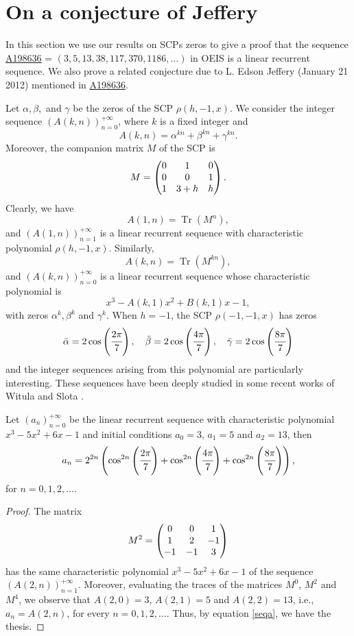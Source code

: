 \documentclass[12pt,reqno]{article}
\newcommand{\seqnum}[1]{\href{http://oeis.org/#1}{\underline{#1}}}
\DeclareMathOperator{\Tr}{Tr}
\begin{document}
\section{On a conjecture of Jeffery}
In this section we use our results on SCPs zeros to give a proof that
the sequence \seqnum{A198636} = $(3, 5, 13, 38, 117, 370, 1186,\ldots)$
in OEIS \cite{oeis} is a linear recurrent sequence. We also prove a
related conjecture due to L. Edson Jeffery (January 21 2012) 
mentioned in \seqnum{A198636}.

Let $\alpha, \beta,$ and $\gamma$ be the zeros of the SCP $\rho(h,-1,x)$. We consider the integer sequence $(A(k,n))_{n=0}^{+\infty}$, where $k$ is a fixed integer and
\begin{equation} \label{seqa}  A(k,n)=\alpha^{kn}+\beta^{kn}+\gamma^{kn}.\end{equation}
Moreover, the companion matrix $M$ of the SCP is
$$M=\begin{pmatrix} 0 & 1 & 0 \cr 0 & 0 & 1 \cr 1 & 3+h & h  \end{pmatrix}.$$ Clearly, we have
$$A(1,n)=\Tr(M^n),$$
and $(A(1,n))_{n=1}^{+\infty}$ is a linear recurrent sequence with characteristic polynomial $\rho(h,-1,x)$. Similarly, 
$$A(k,n)=\Tr(M^{kn}),$$
and $(A(k,n))_{n=0}^{+\infty}$ is a linear recurrent sequence whose characteristic polynomial is $$x^3-A(k,1)x^2+B(k,1)x-1,$$ with zeros $\alpha^k, \beta^k$ and $\gamma^k$.
When $h=-1$, the SCP $\rho(-1,-1,x)$ has zeros
$$\bar\alpha=2\cos\left(\cfrac{2\pi}{7}\right),\quad \bar\beta=2\cos\left(\cfrac{4\pi}{7}\right),\quad \bar\gamma=2\cos\left(\cfrac{8\pi}{7}\right)$$ 
and the integer sequences arising from this polynomial are particularly interesting. These sequences have been deeply studied in some recent works of Witula and Slota \cite{Slota, quasifib, Witula2}.
\begin{lemma}\label{A(2,n)}
Let $(a_n)_{n=0}^{+\infty}$ be the linear recurrent sequence with characteristic polynomial $x^3-5x^2+6x-1$ and initial conditions $a_0=3$, $a_1=5$ and $a_2=13$,
then
$$a_n=2^{2n}\left( \cos^{2n}\left(\cfrac{2\pi}{7}\right) + \cos^{2n}\left(\cfrac{4\pi}{7}\right) + \cos^{2n}\left(\cfrac{8\pi}{7}\right) \right),$$
for $n=0,1,2,\ldots$.
\end{lemma}
\begin{proof}
The matrix
$$M^2=\begin{pmatrix} 0 & 0 & 1 \cr 1 & 2 & -1 \cr -1 & -1 & 3 \end{pmatrix}$$
has the same characteristic polynomial $x^3-5x^2+6x-1$ of the sequence $(A(2,n))_{n=1}^{+\infty}$. Moreover, evaluating the traces of the matrices $M^0$, $M^2$ and $M^4$, we observe that $A(2,0)=3$, $A(2,1)=5$ and $A(2,2)=13$, i.e., $a_n=A(2,n)$, for every $n=0,1,2,\ldots$. Thus, by equation \eqref{seqa}, we have the thesis.
\end{proof}
\end{document}
